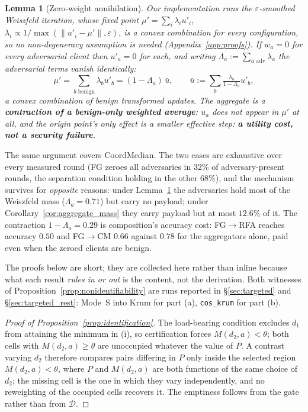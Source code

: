 \documentclass{article}
\newtheorem{lemma}{Lemma}
\begin{document}
\begin{lemma}[Zero-weight annihilation]
\label{lem:annihilation}
Our implementation runs the $\varepsilon$-smoothed Weiszfeld iteration, whose fixed point $\mu' = \sum_i \lambda_i u'_i$, $\lambda_i \propto 1/\max(\|u'_i - \mu'\|, \varepsilon)$, is a convex combination for \emph{every} configuration, so no non-degeneracy assumption is needed (Appendix~\ref{app:proofs}). If $w_a = 0$ for every adversarial client then $u'_a = 0$ for each, and writing $\Lambda_a := \sum_{a \text{ adv}} \lambda_a$ the adversarial terms vanish identically:
\[
\mu' = \textstyle\sum_{b \text{ benign}} \lambda_b u'_b = (1 - \Lambda_a)\,\bar u, \qquad \bar u := \textstyle\sum_b \tfrac{\lambda_b}{1-\Lambda_a} u'_b,
\]
a convex combination of benign transformed updates. The aggregate is a \textbf{contraction of a benign-only weighted average}: $u_a$ does not appear in $\mu'$ at all, and the origin point's only effect is a smaller effective step: \textbf{a utility cost, not a security failure}.
\end{lemma}

\noindent The same argument covers CoordMedian. The two cases are exhaustive over every measured round (FG zeroes all adversaries in 32\% of adversary-present rounds, the separation condition holding in the other 68\%), and the mechanism survives for \emph{opposite} reasons: under Lemma~\ref{lem:annihilation} the adversaries hold most of the Weiszfeld mass ($\Lambda_a = 0.71$) but carry no payload; under Corollary~\ref{cor:aggregate_mass} they carry payload but at most $12.6\%$ of it. The contraction $1-\Lambda_a = 0.29$ is composition's accuracy cost: FG$\to$RFA reaches accuracy $0.50$ and FG$\to$CM $0.66$ against $0.78$ for the aggregators alone, paid even when the zeroed clients are benign.

\noindent The proofs below are short; they are collected here rather than inline because what each result \emph{rules in or out} is the content, not the derivation. Both witnesses of Proposition~\ref{prop:nonidentifiability} are runs reported in \S\ref{sec:targeted} and \S\ref{sec:targeted_rest}: Mode~S into Krum for part (a), \texttt{cos\_krum} for part (b).

\begin{proof}[Proof of Proposition~\ref{prop:identification}]
The load-bearing condition excludes $d_1$ from attaining the minimum in (i), so certification forces $M(d_2,a) < \theta$; both cells with $M(d_2,a) \ge \theta$ are unoccupied whatever the value of $P$. A contrast varying $d_2$ therefore compares pairs differing in $P$ only inside the selected region $M(d_2,a) < \theta$, where $P$ and $M(d_2,a)$ are both functions of the same choice of $d_2$; the missing cell is the one in which they vary independently, and no reweighting of the occupied cells recovers it. The emptiness follows from the gate rather than from $\mathcal{D}$.
\end{proof}
\end{document}
